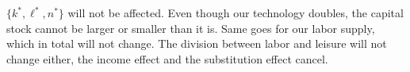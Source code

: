 \documentclass{scrartcl}
\begin{document}
$\{k^*, \ell^*, n^*\}$ will not be affected. Even though our technology doubles, the capital stock cannot be larger or smaller than it is. Same goes for our labor supply, which in total will not change. The division between labor and leisure will not change either, the income effect and the substitution effect cancel. 
\end{document}
